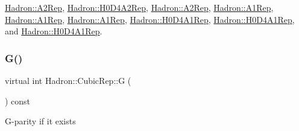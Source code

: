 \mbox{\hyperlink{structHadron_1_1A2Rep_a17b15564f35f6be6afa4a189806da16b}{Hadron\+::\+A2\+Rep}}, \mbox{\hyperlink{structHadron_1_1H0D4A2Rep_ab746308c018d06bc8d3e1822f84c9049}{Hadron\+::\+H0\+D4\+A2\+Rep}}, \mbox{\hyperlink{structHadron_1_1A2Rep_a17b15564f35f6be6afa4a189806da16b}{Hadron\+::\+A2\+Rep}}, \mbox{\hyperlink{structHadron_1_1A1Rep_a4f7f61f8c9a5113c9407be6609cf7fbe}{Hadron\+::\+A1\+Rep}}, \mbox{\hyperlink{structHadron_1_1A1Rep_a4f7f61f8c9a5113c9407be6609cf7fbe}{Hadron\+::\+A1\+Rep}}, \mbox{\hyperlink{structHadron_1_1A1Rep_a4f7f61f8c9a5113c9407be6609cf7fbe}{Hadron\+::\+A1\+Rep}}, \mbox{\hyperlink{structHadron_1_1H0D4A1Rep_ac5a45aa7f7cdc3ab70b8c164b2e1dce0}{Hadron\+::\+H0\+D4\+A1\+Rep}}, \mbox{\hyperlink{structHadron_1_1H0D4A1Rep_ac5a45aa7f7cdc3ab70b8c164b2e1dce0}{Hadron\+::\+H0\+D4\+A1\+Rep}}, and \mbox{\hyperlink{structHadron_1_1H0D4A1Rep_ac5a45aa7f7cdc3ab70b8c164b2e1dce0}{Hadron\+::\+H0\+D4\+A1\+Rep}}.

\mbox{\label{structHadron_1_1CubicRep_a52104e43266d1614c00bbd1c3b395458}} 
\subsubsection{\texorpdfstring{G()}{G()}\hspace{0.1cm}{\footnotesize\ttfamily [1/3]}}
{\footnotesize\ttfamily virtual int Hadron\+::\+Cubic\+Rep\+::G (\begin{DoxyParamCaption}{ }\end{DoxyParamCaption}) const\hspace{0.3cm}{\ttfamily [pure virtual]}}

G-\/parity if it exists 

